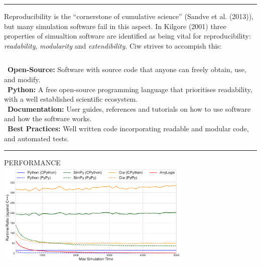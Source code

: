 \documentclass[usenames,dvipsnames,t]{beamer}
\begin{document}
\textcolor{textgrey}{\hrule height 3pt}

\vspace{5mm}

Reproducibility is the ``cornerstone of cumulative science''
(\textcolor{textorange}{Sandve et al. (2013)}), but many simulation software
fail in this aspect.
In \textcolor{textorange}{Kilgore (2001)} three properties of simualtion
software are identified as being vital for reproducibility:
\textit{readability}, \textit{modularity} and \textit{extendibility}.
Ciw strives to accompish this:

\begin{columns}
\begin{column}{0.5\textwidth}
\begin{center}
  

  \vspace{12mm}

  \begin{minipage}[c]{0.975\textwidth}
    \textbullet\ \textbf{Open-Source:} Software with source code that anyone can freely obtain, use, and modify.\\[3.5mm]
    \textbullet\ \textbf{Python:} A free open-source programming language that prioritises readability, with a well established   scientific ecosystem.\\[3.5mm]
    \textbullet\ \textbf{Documentation:} User guides, references and tutorials on how to use software and how the software works.\\[3.5mm]
    \textbullet\ \textbf{Best Practices:} Well written code incorporating readable and modular code, and automated tests.
  \end{minipage}
\end{center}

\vspace{5mm}
\textcolor{textgrey}{\hrule height 3pt}
\vspace{5mm}

\begin{center}
  \textcolor{textgrey}{\Large{PERFORMANCE}\vspace{4mm}}\\
  \includegraphics[width=0.7\textwidth]{runtimes}
\end{center}


\end{column}
\end{columns}
\end{document}

